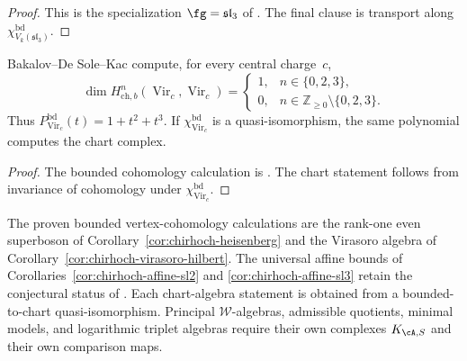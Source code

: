 \begin{proof}
This is the specialization \(\fg=\mathfrak{sl}_3\) of
\cite[Conjecture~7.5]{BDSK21}.  The final clause is transport along
\(\chi_{V_k(\mathfrak{sl}_3)}^{\mathrm{bd}}\).
\end{proof}

\begin{corollary}
\label{cor:chirhoch-virasoro-hilbert}
Bakalov--De Sole--Kac compute, for every central charge~\(c\),
\[
 \dim H^n_{\mathrm{ch},b}(\operatorname{Vir}_c,
 \operatorname{Vir}_c)
 =\begin{cases}
 1,&n\in\{0,2,3\},\\
 0,&n\in\mathbb Z_{\geq0}\setminus\{0,2,3\}.
 \end{cases}
\]
Thus \(P^{\mathrm{bd}}_{\operatorname{Vir}_c}(t)=1+t^2+t^3\).
If \(\chi_{\operatorname{Vir}_c}^{\mathrm{bd}}\) is a
quasi-isomorphism, the same polynomial computes the chart complex.
\end{corollary}

\begin{proof}
The bounded cohomology calculation is
\cite[Theorem~7.2]{BDSK21}.  The chart statement follows from
invariance of cohomology under \(\chi_{\operatorname{Vir}_c}^{\mathrm{bd}}\).
\end{proof}

\begin{remark}
\label{rem:standard-family-theorem-h-computation-surfaces}
The proven bounded vertex-cohomology calculations are the rank-one
even superboson of Corollary~\ref{cor:chirhoch-heisenberg} and the
Virasoro algebra of
Corollary~\ref{cor:chirhoch-virasoro-hilbert}.  The universal affine
bounds of Corollaries~\ref{cor:chirhoch-affine-sl2} and
\ref{cor:chirhoch-affine-sl3} retain the conjectural status of
\cite[Conjecture~7.5]{BDSK21}.  Each chart-algebra statement is
obtained from a bounded-to-chart quasi-isomorphism.  Principal
\(\mathcal W\)-algebras, admissible quotients, minimal models, and
logarithmic triplet algebras require their own complexes
\(K_{\cA,S}\) and their own comparison maps.
\end{remark}

